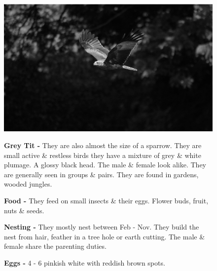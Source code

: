 \begin{figure}[H]
\begin{center}
\includegraphics{figure/Land_birds/01_pariah_kite/pariah-kite.eps}
\end{center}
\medskip
\noindent
{\bf Grey Tit -} They are also almost the size of a sparrow. They are small active \& restless birds they have a mixture of grey \& white plumage. A glossy black head. The male \& female look alike. They are generally seen in groups \& pairs. They are found in gardens, wooded jungles. 

\medskip
{\bf Food -} They feed on small insects \& their eggs. Flower buds, fruit, nuts \& seeds.

{\bf Nesting -} They mostly nest between Feb - Nov. They build the nest from hair, feather in a tree hole or earth cutting. The male \& female share the parenting duties.

{\bf Eggs -} 4 - 6 pinkish white with reddish brown spots.
\end{figure}

\vfill\eject

~\phantom{a}
\vfill

